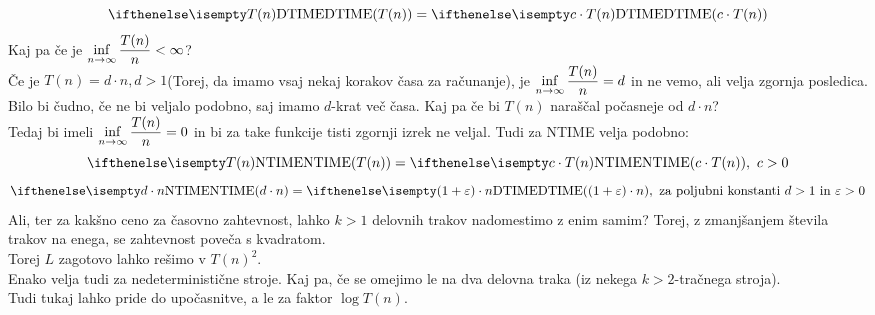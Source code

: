 \documentclass[10pt,a4paper,oneside]{book}
\begin{document}
\begin{neurejeno}
{\[ \DTIME{T(n)} = \DTIME{c \cdot T(n)} \]
}
Kaj pa če je $\displaystyle\inf_{n\to\infty} {T(n) \over n} < \infty$?\\
Če je $T(n)=d\cdot n, d>1$(Torej, da imamo vsaj nekaj korakov časa za računanje), je $\displaystyle\inf_{n\to\infty} {T(n) \over n} = d$ in ne vemo, ali velja zgornja posledica. Bilo bi čudno, če ne bi veljalo podobno, saj imamo $d$-krat več časa.
Kaj pa če bi $T(n)$ naraščal počasneje od $d \cdot n$?\\
Tedaj bi imeli $\displaystyle\inf_{n\to\infty} {T(n) \over n} = 0$ %
 in bi za take funkcije tisti zgornji izrek ne veljal.%
\br
Tudi za NTIME velja podobno:
	\[ \NTIME{T(n)} = \NTIME{c\cdot T(n)},\ c>0 \]%
	\[ \NTIME{d \cdot n} = \DTIME{(1+\varepsilon)\cdot n},\mbox{ za poljubni konstanti $d>1$ in $\varepsilon>0$} \]
Ali, ter za kakšno ceno za časovno zahtevnost, lahko $k>1$ delovnih trakov nadomestimo z enim samim?
Torej, z zmanjšanjem števila trakov na enega, se zahtevnost poveča s kvadratom.\\
Torej $L$ zagotovo lahko rešimo v $T(n)^2$.\\
Enako velja tudi za nedeterministične stroje.
\br
Kaj pa, če se omejimo le na dva delovna traka (iz nekega $k>2$-tračnega stroja).\\
Tudi tukaj lahko pride do upočasnitve, a le za faktor $\log T(n)$.\\
\end{neurejeno}
\end{document}
